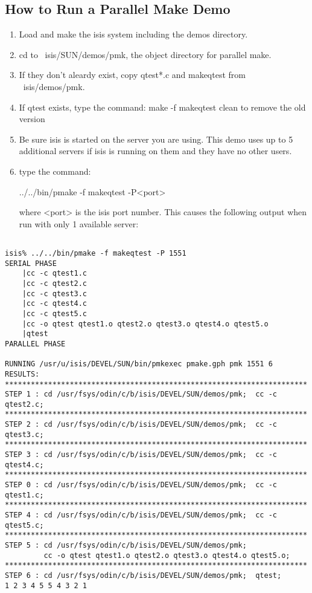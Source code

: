 \subsection*{How to Run a Parallel Make Demo}
\begin{enumerate}

\item Load and make the isis system including the demos directory.

\item cd to ~isis/SUN/demos/pmk, the object directory for parallel make.

\item If they don't aleardy exist, copy qtest*.c and makeqtest from
     ~isis/demos/pmk.

\item If qtest exists, type the command:
     make -f makeqtest clean
     to remove the old version

\item Be sure isis is started on the server you are using.  This demo uses up
     to 5 additional servers if isis is running on them and they have no
     other users.

\item type the command:
     
     ../../bin/pmake -f makeqtest -P<port>

     where <port> is the isis port number.
     This causes the following output when run with only 1 available server:
\end{enumerate}
\begin{verbatim}

isis% ../../bin/pmake -f makeqtest -P 1551
SERIAL PHASE
    |cc -c qtest1.c
    |cc -c qtest2.c
    |cc -c qtest3.c
    |cc -c qtest4.c
    |cc -c qtest5.c
    |cc -o qtest qtest1.o qtest2.o qtest3.o qtest4.o qtest5.o
    |qtest
PARALLEL PHASE

RUNNING /usr/u/isis/DEVEL/SUN/bin/pmkexec pmake.gph pmk 1551 6
RESULTS:
**********************************************************************
STEP 1 : cd /usr/fsys/odin/c/b/isis/DEVEL/SUN/demos/pmk;  cc -c qtest2.c; 
**********************************************************************
STEP 2 : cd /usr/fsys/odin/c/b/isis/DEVEL/SUN/demos/pmk;  cc -c qtest3.c; 
**********************************************************************
STEP 3 : cd /usr/fsys/odin/c/b/isis/DEVEL/SUN/demos/pmk;  cc -c qtest4.c; 
**********************************************************************
STEP 0 : cd /usr/fsys/odin/c/b/isis/DEVEL/SUN/demos/pmk;  cc -c qtest1.c; 
**********************************************************************
STEP 4 : cd /usr/fsys/odin/c/b/isis/DEVEL/SUN/demos/pmk;  cc -c qtest5.c; 
**********************************************************************
STEP 5 : cd /usr/fsys/odin/c/b/isis/DEVEL/SUN/demos/pmk; 
         cc -o qtest qtest1.o qtest2.o qtest3.o qtest4.o qtest5.o; 
**********************************************************************
STEP 6 : cd /usr/fsys/odin/c/b/isis/DEVEL/SUN/demos/pmk;  qtest; 
1 2 3 4 5 5 4 3 2 1
\end{verbatim}

